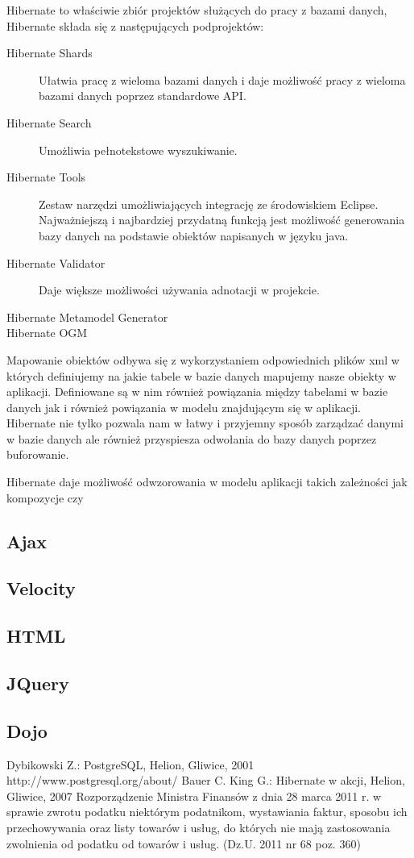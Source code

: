 Hibernate to właściwie zbiór projektów służących do pracy z bazami danych, Hibernate składa się z następujących 
podprojektów:
\begin{description}
  \item[Hibernate Shards] Ułatwia pracę z wieloma bazami danych i daje możliwość pracy z wieloma bazami danych
  poprzez standardowe API.
  \item[Hibernate Search] Umożliwia pełnotekstowe wyszukiwanie.
  \item[Hibernate Tools] Zestaw narzędzi umożliwiających integrację ze środowiskiem Eclipse. Najważniejszą 
  i najbardziej przydatną funkcją jest możliwość generowania bazy danych na podstawie obiektów napisanych w
  języku java.
  \item[Hibernate Validator] Daje większe możliwości używania adnotacji w projekcie.
  \item[Hibernate Metamodel Generator] 
  \item[Hibernate OGM ]
\end{description}

Mapowanie obiektów odbywa się z wykorzystaniem 
odpowiednich plików xml w których definiujemy na jakie tabele w bazie danych mapujemy nasze obiekty w
aplikacji. Definiowane są w nim również powiązania między tabelami w bazie danych jak i również 
powiązania w modelu znajdującym się w aplikacji.
 Hibernate nie tylko pozwala nam w łatwy i przyjemny sposób zarządzać danymi w bazie danych ale również
przyspiesza odwołania do bazy danych poprzez buforowanie.

Hibernate daje możliwość odwzorowania w modelu aplikacji takich zależności jak kompozycje czy 
\subsection{Ajax}
\subsection{Velocity}
\subsection{HTML}
\subsection{JQuery}
\subsection{Dojo}
\newpage
\begin{thebibliography}{szerokosc}
Dybikowski Z.: PostgreSQL, Helion, Gliwice, 2001
http://www.postgresql.org/about/
Bauer C. King G.: Hibernate w akcji, Helion, Gliwice, 2007
Rozporządzenie Ministra Finansów z dnia 28 marca
2011 r.
w sprawie zwrotu podatku niektórym podatnikom, wystawiania faktur, sposobu ich
przechowywania oraz listy towarów i usług, do których nie mają zastosowania
zwolnienia od podatku od towarów i usług. (Dz.U. 2011 nr 68 poz. 360)
\end{thebibliography}